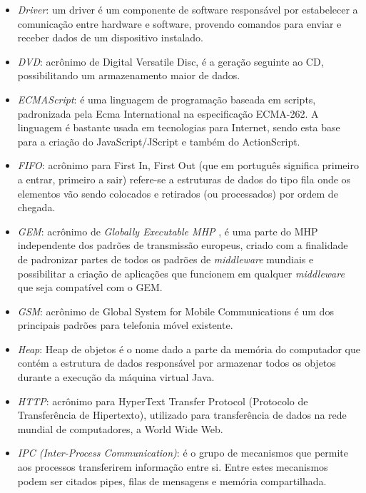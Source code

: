 \begin{itemize}
  \item \emph{Driver}: um driver é um componente de software responsável por estabelecer a comunicação entre hardware e software, provendo comandos para enviar e receber dados de um dispositivo instalado.

  \item \emph{DVD}: acrônimo de Digital Versatile Disc, é a geração seguinte ao CD, possibilitando um armazenamento maior de dados.

  \item \emph{ECMAScript}: é uma linguagem de programação baseada em scripts, padronizada pela Ecma International na especificação ECMA-262. A linguagem é bastante usada em tecnologias para Internet, sendo esta base para a criação do JavaScript/JScript e também do ActionScript.

  \item \emph{FIFO}: acrônimo para {F}irst {I}n, {F}irst {O}ut (que em português significa primeiro a entrar, primeiro a sair) refere-se a estruturas de dados do tipo fila onde os elementos vão sendo colocados e retirados (ou processados) por ordem de chegada.

  \item \emph{GEM}: acrônimo de \emph{Globally Executable MHP} \cite{gem}, é uma parte do MHP independente dos padrões de transmissão europeus, criado com a finalidade de padronizar partes de todos os padrões de \emph{middleware} mundiais e possibilitar a criação de aplicações que funcionem em qualquer \emph{middleware} que seja compatível com o GEM.

  \item \emph{GSM}: acrônimo de Global System for Mobile Communications é um dos principais padrões para telefonia móvel existente.

  \item \emph{Heap}: Heap de objetos é o nome dado a parte da memória do computador que contém a estrutura de dados responsável por armazenar todos os objetos durante a execução da máquina virtual Java.

  \item \emph{HTTP}: acrônimo para {H}yperText {T}ransfer {P}rotocol (Protocolo de Transferência de Hipertexto), utilizado para transferência de dados na rede mundial de computadores, a World Wide Web.

  \item \emph{IPC (Inter-Process Communication)}: é o grupo de mecanismos que permite aos processos transferirem informação entre si. Entre estes mecanismos podem ser citados pipes, filas de mensagens e memória compartilhada.


\end{itemize}

